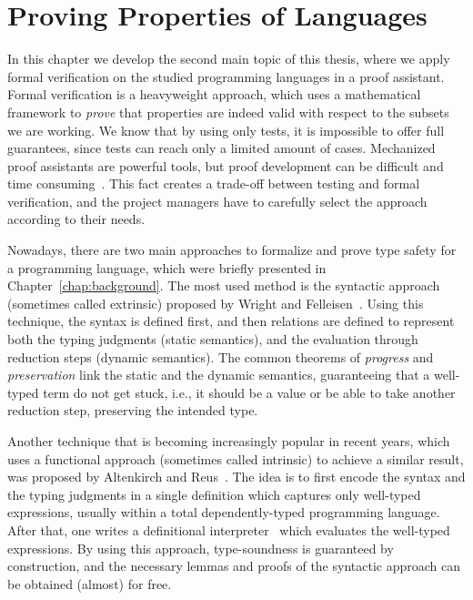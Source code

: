 \documentclass[tese,capa,english]{texufpel}
\begin{document}















\chapter{Proving Properties of Languages}
\label{chap:proving}

In this chapter we develop the second main topic of this thesis, where we apply formal verification on the studied programming languages in a proof assistant. Formal verification is a heavyweight approach, which uses a mathematical framework to \emph{prove} that properties are indeed valid with respect to the subsets we are working. We know that by using only tests, it is impossible to offer full guarantees, since tests can reach only a limited amount of cases. Mechanized proof assistants are powerful tools, but proof development can be difficult and time consuming~\cite{Delaware:2011:PLT:2076021.2048113}. This fact creates a trade-off between testing and formal verification, and the project managers have to carefully select the approach according to their needs.

Nowadays, there are two main approaches to formalize and prove type safety for a programming language, which were briefly presented in Chapter~\ref{chap:background}. The most used method is the syntactic approach (sometimes called extrinsic) proposed by Wright and Felleisen~\cite{Wright:1994:SAT:191905.191909}. Using this technique, the syntax is defined first, and then relations are defined to represent both the typing judgments (static semantics), and the evaluation through reduction steps (dynamic semantics). The common theorems of \emph{progress} and \emph{preservation} link the static and the dynamic semantics, guaranteeing that a well-typed term do not get stuck, i.e., it should be a value or be able to take another reduction step, preserving the intended type.

Another technique that is becoming increasingly popular in recent years, which uses a functional approach (sometimes called intrinsic) to achieve a similar result, was proposed by Altenkirch and Reus~\cite{Altenkirch:1999:MPL:647849.737066}. The idea is to first encode the syntax and the typing judgments in a single definition which captures only well-typed expressions, usually within a total dependently-typed programming language. After that, one writes a definitional interpreter~\cite{Reynolds:1972:DIH:800194.805852} which evaluates the well-typed expressions. By using this approach, type-soundness is guaranteed by construction, and the necessary lemmas and proofs of the syntactic approach can be obtained (almost) for free.
\end{document}
